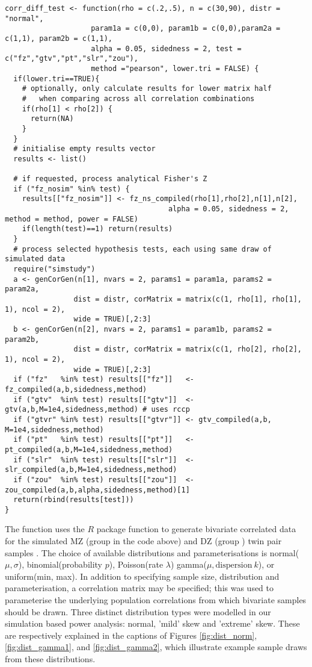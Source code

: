 \begin{lstlisting}[float=h,caption={Single run simulation code},label={lst:corr_diff}]
corr_diff_test <- function(rho = c(.2,.5), n = c(30,90), distr = "normal",
                    param1a = c(0,0), param1b = c(0,0),param2a = c(1,1), param2b = c(1,1),
                    alpha = 0.05, sidedness = 2, test = c("fz","gtv","pt","slr","zou"),
                    method ="pearson", lower.tri = FALSE) {
  if(lower.tri==TRUE){
    # optionally, only calculate results for lower matrix half 
    #   when comparing across all correlation combinations
    if(rho[1] < rho[2]) { 
      return(NA)
    }
  }
  # initialise empty results vector
  results <- list()
  
  # if requested, process analytical Fisher's Z
  if ("fz_nosim" %in% test) {
    results[["fz_nosim"]] <- fz_ns_compiled(rho[1],rho[2],n[1],n[2], 
                                      alpha = 0.05, sidedness = 2, method = method, power = FALSE)
    if(length(test)==1) return(results)
  }
  # process selected hypothesis tests, each using same draw of simulated data
  require("simstudy")
  a <- genCorGen(n[1], nvars = 2, params1 = param1a, params2 = param2a,  
                dist = distr, corMatrix = matrix(c(1, rho[1], rho[1], 1), ncol = 2), 
                wide = TRUE)[,2:3]
  b <- genCorGen(n[2], nvars = 2, params1 = param1b, params2 = param2b,  
                dist = distr, corMatrix = matrix(c(1, rho[2], rho[2], 1), ncol = 2), 
                wide = TRUE)[,2:3]
  if ("fz"   %in% test) results[["fz"]]   <- fz_compiled(a,b,sidedness,method)
  if ("gtv"  %in% test) results[["gtv"]]  <- gtv(a,b,M=1e4,sidedness,method) # uses rccp
  if ("gtvr" %in% test) results[["gtvr"]] <- gtv_compiled(a,b, M=1e4,sidedness,method) 
  if ("pt"   %in% test) results[["pt"]]   <- pt_compiled(a,b,M=1e4,sidedness,method)
  if ("slr"  %in% test) results[["slr"]]  <- slr_compiled(a,b,M=1e4,sidedness,method)
  if ("zou"  %in% test) results[["zou"]]  <- zou_compiled(a,b,alpha,sidedness,method)[1]
  return(rbind(results[test]))
}
\end{lstlisting}

The function  uses the $R$ package  function  to generate bivariate correlated data for the simulated MZ (group  in the code above) and DZ (group ) twin pair samples \cite{simstudy2018}.  The choice of available distributions and parameterisations is normal($\mu,\sigma$), binomial(probability $p$), Poisson(rate $\lambda$) gamma($\mu,\text{dispersion} \ k$), or uniform(min, max).  In addition to specifying sample size, distribution and parameterisation, a correlation matrix may be specified; this was used to parameterise the underlying population correlations from which bivariate samples should be drawn.  Three distinct distribution types were modelled in our simulation based power analysis: normal, 'mild' skew and 'extreme' skew. These are respectively explained in the captions of Figures \ref{fig:dist_norm}, \ref{fig:dist_gamma1}, and \ref{fig:dist_gamma2}, which illustrate example sample draws from these distributions.  

